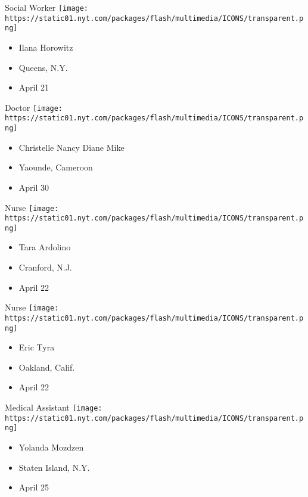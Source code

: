 \protect\hyperlink{item-ilana-horowitz}{}

Social Worker
\texttt{[image: https://static01.nyt.com/packages/flash/multimedia/ICONS/transparent.png]}

\begin{itemize}
\tightlist
\item
  Ilana Horowitz
\item
  Queens, N.Y.
\item
  April 21
\end{itemize}

\protect\hyperlink{item-christelle-nancy-diane-mike}{}

Doctor
\texttt{[image: https://static01.nyt.com/packages/flash/multimedia/ICONS/transparent.png]}

\begin{itemize}
\tightlist
\item
  Christelle Nancy Diane Mike
\item
  Yaounde, Cameroon
\item
  April 30
\end{itemize}

\protect\hyperlink{item-tara-ardolino}{}

Nurse
\texttt{[image: https://static01.nyt.com/packages/flash/multimedia/ICONS/transparent.png]}

\begin{itemize}
\tightlist
\item
  Tara Ardolino
\item
  Cranford, N.J.
\item
  April 22
\end{itemize}

\protect\hyperlink{item-eric-tyra}{}

Nurse
\texttt{[image: https://static01.nyt.com/packages/flash/multimedia/ICONS/transparent.png]}

\begin{itemize}
\tightlist
\item
  Eric Tyra
\item
  Oakland, Calif.
\item
  April 22
\end{itemize}

\protect\hyperlink{item-yolanda-mozdzen}{}

Medical Assistant
\texttt{[image: https://static01.nyt.com/packages/flash/multimedia/ICONS/transparent.png]}

\begin{itemize}
\tightlist
\item
  Yolanda Mozdzen
\item
  Staten Island, N.Y.
\item
  April 25
\end{itemize}

